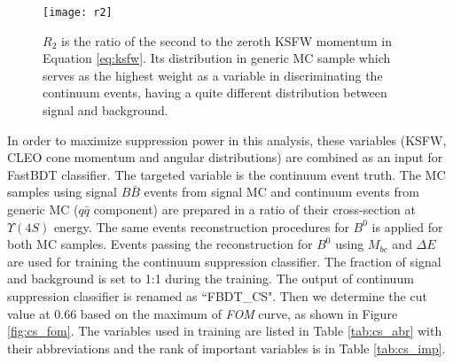 \begin{figure}[H]
	\centering
	\texttt{[image: r2]}
	\caption{$R_2$ is the ratio of the second to the zeroth KSFW momentum in Equation \ref{eq:ksfw}. Its distribution in generic MC sample which serves as the highest weight as a variable in discriminating the continuum events, having a quite different distribution between signal and background.}
	\label{fig:R2}
\end{figure}



  In order to maximize suppression power in this analysis, these variables (KSFW, CLEO cone momentum and angular distributions) are combined as an input for FastBDT classifier. The targeted variable is the continuum event truth. The MC samples using signal $B\bar{B}$ events from signal MC and continuum events from generic MC ($q\bar{q}$ component) are prepared in a ratio of their cross-section at $\Upsilon{(4S)}$ energy. The same events reconstruction procedures for $B^0$ is applied for both MC samples. Events passing the reconstruction for $B^0$ using $M_{bc}$ and $\Delta E$ are used for training the continuum suppression classifier. The fraction of signal and background is set to 1:1 during the training.  The output of continuum suppression classifier is renamed as ``FBDT\_CS". Then we determine the cut value at 0.66 based on the maximum of \textit{FOM} curve, as shown in Figure \ref{fig:cs_fom}. The variables used in training are listed in Table \ref{tab:cs_abr} with their abbreviations and the rank of important variables is in Table \ref{tab:cs_imp}.

